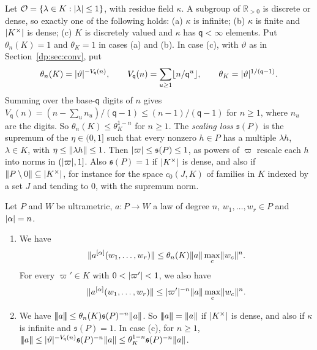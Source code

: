 Let $\mathcal O=\{\lambda\in K:\lvert \lambda\rvert\le1\}$, with residue field $\kappa$. A subgroup of $\mathbb R_{>0}$ is discrete or dense, so exactly one of the following holds: (a) $\kappa$ is infinite; (b) $\kappa$ is finite and $\lvert K^\times\rvert$ is dense; (c) $K$ is discretely valued and $\kappa$ has $\mathsf q<\infty$ elements. Put $\theta_n(K)=1$ and $\theta_K=1$ in cases (a) and (b). In case (c), with $\vartheta$ as in Section~\ref{dp:sec:conv}, put
\[
 \theta_n(K)=\lvert \vartheta\rvert^{-V_{\mathsf q}(n)},\qquad V_{\mathsf q}(n)=\sum_{u\ge1}\lfloor n/\mathsf q^u\rfloor,\qquad\theta_K=\lvert \vartheta\rvert^{1/(\mathsf q-1)}.
\]
Summing over the base-$\mathsf q$ digits of $n$ gives $V_{\mathsf q}(n)=(n-\sum_un_u)/(\mathsf q-1)\le(n-1)/(\mathsf q-1)$ for $n\ge1$, where $n_u$ are the digits. So $\theta_n(K)\le\theta_K^{1-n}$ for $n\ge1$. The \emph{scaling loss} $\mathfrak s(P)$ is the supremum of the $\eta\in(0,1]$ such that every nonzero $h\in P$ has a multiple $\lambda h$, $\lambda\in K$, with $\eta\le\lVert \lambda h\rVert\le1$. Then $\lvert \varpi\rvert\le\mathfrak s(P)\le1$, as powers of $\varpi$ rescale each $h$ into norms in $(\lvert \varpi\rvert,1]$. Also $\mathfrak s(P)=1$ if $\lvert K^\times\rvert$ is dense, and also if $\lVert P\setminus0\rVert\subseteq\lvert K^\times\rvert$, for instance for the space $c_0(J,K)$ of families in $K$ indexed by a set $J$ and tending to $0$, with the supremum norm.

\begin{lemma}\label{dp:lem:strong-coefficients}
Let $P$ and $W$ be ultrametric, $a\colon P\to W$ a law of degree $n$, $w_1,\dots,w_r\in P$ and $\lvert \alpha\rvert=n$.
\begin{enumerate}
\item We have
\[
 \lVert a^{[\alpha]}(w_1,\dots,w_r)\rVert\le\theta_n(K)\lVert a\rVert\max_c\lVert w_c\rVert^n.
\]
For every $\varpi'\in K$ with $0<\lvert \varpi'\rvert<1$, we also have
\[
 \lVert a^{[\alpha]}(w_1,\dots,w_r)\rVert\le\lvert \varpi'\rvert^{-n}\lVert a\rVert\max_c\lVert w_c\rVert^n.
\]
\item We have $\lvert\!\lvert\!\lvert a\rvert\!\rvert\!\rvert\le\theta_n(K)\mathfrak s(P)^{-n}\lVert a\rVert$. So $\lvert\!\lvert\!\lvert a\rvert\!\rvert\!\rvert=\lVert a\rVert$ if $\lvert K^\times\rvert$ is dense, and also if $\kappa$ is infinite and $\mathfrak s(P)=1$. In case (c), for $n\ge1$, $\lvert\!\lvert\!\lvert a\rvert\!\rvert\!\rvert\le\lvert \vartheta\rvert^{-V_{\mathsf q}(n)}\mathfrak s(P)^{-n}\lVert a\rVert\le\theta_K^{1-n}\mathfrak s(P)^{-n}\lVert a\rVert$.
\end{enumerate}
\end{lemma}

